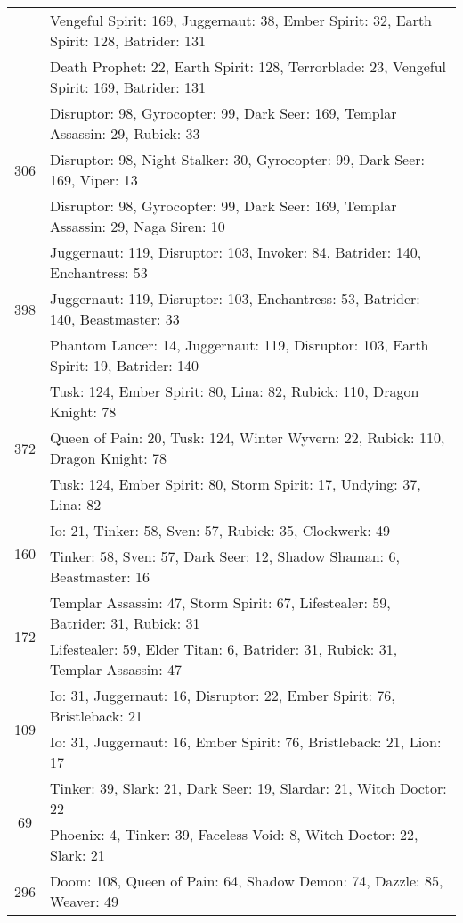 \documentclass[result.tex]{subfiles}
\begin{document}
\begin{table}[H]
\begin{tabular}{ | c | p{12.5cm} | }
& Vengeful Spirit: 169, Juggernaut: 38, Ember Spirit: 32, Earth Spirit: 128, Batrider: 131 \\
& Death Prophet: 22, Earth Spirit: 128, Terrorblade: 23, Vengeful Spirit: 169, Batrider: 131 \\
\hline
\multirow{3}{*}{306}
& Disruptor: 98, Gyrocopter: 99, Dark Seer: 169, Templar Assassin: 29, Rubick: 33 \\
& Disruptor: 98, Night Stalker: 30, Gyrocopter: 99, Dark Seer: 169, Viper: 13 \\
& Disruptor: 98, Gyrocopter: 99, Dark Seer: 169, Templar Assassin: 29, Naga Siren: 10 \\
\hline
\multirow{3}{*}{398}
& Juggernaut: 119, Disruptor: 103, Invoker: 84, Batrider: 140, Enchantress: 53 \\
& Juggernaut: 119, Disruptor: 103, Enchantress: 53, Batrider: 140, Beastmaster: 33 \\
& Phantom Lancer: 14, Juggernaut: 119, Disruptor: 103, Earth Spirit: 19, Batrider: 140 \\
\hline
\multirow{3}{*}{372}
& Tusk: 124, Ember Spirit: 80, Lina: 82, Rubick: 110, Dragon Knight: 78 \\
& Queen of Pain: 20, Tusk: 124, Winter Wyvern: 22, Rubick: 110, Dragon Knight: 78 \\
& Tusk: 124, Ember Spirit: 80, Storm Spirit: 17, Undying: 37, Lina: 82 \\
\hline
\multirow{2}{*}{160}
& Io: 21, Tinker: 58, Sven: 57, Rubick: 35, Clockwerk: 49 \\
& Tinker: 58, Sven: 57, Dark Seer: 12, Shadow Shaman: 6, Beastmaster: 16 \\
\hline
\multirow{2}{*}{172}
& Templar Assassin: 47, Storm Spirit: 67, Lifestealer: 59, Batrider: 31, Rubick: 31 \\
& Lifestealer: 59, Elder Titan: 6, Batrider: 31, Rubick: 31, Templar Assassin: 47 \\
\hline
\multirow{2}{*}{109}
& Io: 31, Juggernaut: 16, Disruptor: 22, Ember Spirit: 76, Bristleback: 21 \\
& Io: 31, Juggernaut: 16, Ember Spirit: 76, Bristleback: 21, Lion: 17 \\
\hline
\multirow{2}{*}{69}
& Tinker: 39, Slark: 21, Dark Seer: 19, Slardar: 21, Witch Doctor: 22 \\
& Phoenix: 4, Tinker: 39, Faceless Void: 8, Witch Doctor: 22, Slark: 21 \\
\hline
\multirow{2}{*}{296}
& Doom: 108, Queen of Pain: 64, Shadow Demon: 74, Dazzle: 85, Weaver: 49 \\

\end{tabular}
\end{table}
\end{document}
